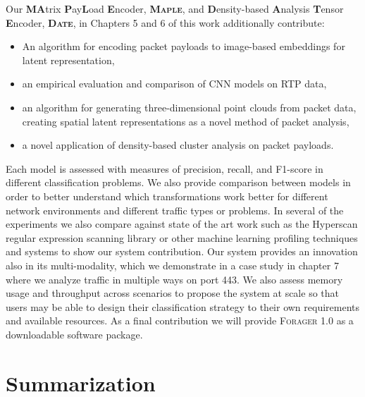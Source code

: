 Our \textbf{MA}trix \textbf{P}ay\textbf{L}oad \textbf{E}ncoder, \textbf{\textsc{Maple}}, and \textbf{D}ensity-based \textbf{A}nalysis \textbf{T}ensor \textbf{E}ncoder, \textbf{\textsc{Date}}, in Chapters 5 and 6 of this work additionally contribute:

\begin{itemize}
\item An algorithm for encoding packet payloads to image-based embeddings for latent representation,
\item an empirical evaluation and comparison of CNN models on RTP data,
\item an algorithm for generating three-dimensional point clouds from packet data, creating spatial latent representations as a novel method of packet analysis,
\item a novel application of density-based cluster analysis on packet payloads.
\end{itemize}

Each model is assessed with measures of precision, recall, and F1-score in different classification problems. We also provide comparison between models in order to better understand which transformations work better for different network environments and different traffic types or problems. In several of the experiments we also compare against state of the art work such as the Hyperscan regular expression scanning library or other machine learning profiling techniques and systems to show our system contribution. Our system provides an innovation also in its multi-modality, which we demonstrate in a case study in chapter 7 where we analyze traffic in multiple ways on port 443. We also assess memory usage and throughput across scenarios to propose the system at scale so that users may be able to design their classification strategy to their own requirements and available resources. As a final contribution we will provide \textsc{Forager} 1.0 as a downloadable software package.

\section{Summarization}

